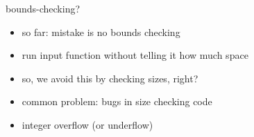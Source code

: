 \begin{frame}{bounds-checking?}
    \begin{itemize}
    \item so far: mistake is no bounds checking
    \item run input function without telling it how much space
    \vspace{.5cm}
    \item so, we avoid this by checking sizes, right?
    \item common problem: bugs in size checking code
    \item integer overflow (or underflow)
    \end{itemize}
\end{frame}
